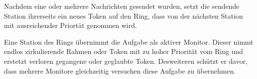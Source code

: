 Nachdem eine oder mehrere Nachrichten gesendet wurden, setzt die sendende
Station ihrerseits ein neues Token auf den Ring, dass von der nächsten Station
mit ausreichender Priortät genommen wird.

Eine Station des Rings übernimmt die Aufgabe als aktiver Monitor. Dieser nimmt
endlos zirkulierende Rahmen oder Token mit zu hoher Priorität vom Ring und
erstetzt verloren gegangene oder geglaubte Token. Desweiteren schützt er davor,
dass mehrere Monitore gleichzeitig versuchen diese Aufgabe zu übernehmen.